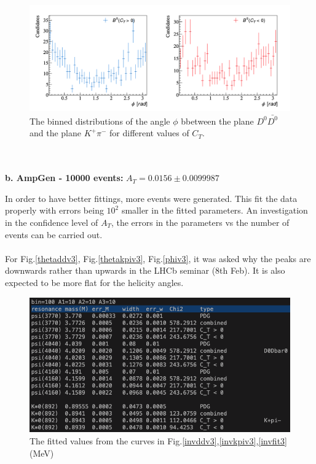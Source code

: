 \begin{figure}[h]
\center
\includegraphics*[width=0.96\linewidth]{CM_variables_B0/B0_planeangle_1000}
\caption{The binned distributions of the angle $\phi$ bbetween the plane $D^0\bar{D^0}$ and the plane $K^+\pi^-$ for different values of $C_T$.}
\label{phiv2}
\end{figure}
\clearpage
\\
\\
\textbf{b. AmpGen - 10000 events:} $A_T = 0.0156 \pm 0.0099987$
\begin{itemize}
    In order to have better fittings, more events were generated. This fit the data properly with errors being $10^2$ smaller in the fitted parameters. An investigation in the confidence level of $A_T$, the errors in the parameters vs the number of events can be carried out.
    \\
    \\
    For Fig.\ref{thetaddv3}, Fig.\ref{thetakpiv3}, Fig.\ref{phiv3}, it was asked why the peaks are downwards rather than upwards in the LHCb seminar (8th Feb). It is also expected to be more flat for the helicity angles.
\end{itemize}
\begin{figure}[h]
\center
\includegraphics*[width=0.96\linewidth]{CM_variables_B0/B0_invmass_fit_output_10000}
\caption{The fitted values from the curves in Fig.\ref{invddv3},\ref{invkpiv3},\ref{invfit3}(MeV)}
\label{ddkpi_fitdata3}
\end{figure}
